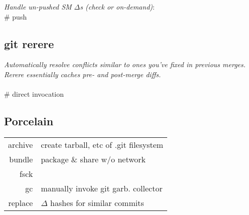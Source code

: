 \textit{Handle un-pushed SM $\Delta$s (check or on-demand)}:\\
 \# push
\begin{comment}
{\scriptsize
\begin{itemize}
\item diff.submodule
\item submodule.<SM>.branch
\item status.submodulesummary
\item submodule.recurse***
\item push.recurseSubmodules
\end{itemize}}\ \\
\end{comment}


\subsection*{git rerere}
\textit{Automatically resolve conflicts similar to ones you've fixed in previous merges. Rerere essentially caches pre- and post-merge diffs.}\\
\\
 \# direct invocation


\subsection*{Porcelain}
{\scriptsize
\begin{tabular}{r l}
archive & create tarball, etc of .git filesystem\\
bundle & package \& share w/o network \\
fsck & \\
gc & manually invoke git garb. collector\\
replace & $\Delta$ hashes for similar commits \\
\end{tabular}}


